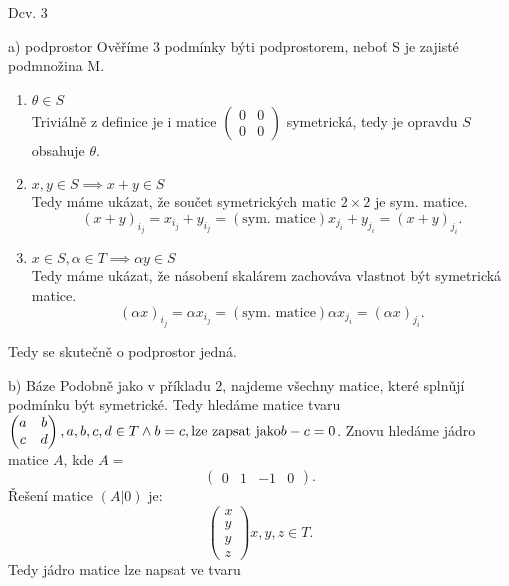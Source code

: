 \documentclass[a4paper]{article}
\begin{document}
\begin{section}{Dcv. 3}
\begin{subsection}{a) podprostor}
    Ověříme 3 podmínky býti podprostorem, neboť S je zajisté podmnožina M.
    \begin{enumerate}
        \item $\theta \in S$\\
            Triviálně z definice je i matice $\begin{pmatrix} 0 & 0 \\ 0 & 0 \end{pmatrix}$ symetrická,
            tedy je opravdu $S$ obsahuje $\theta$.
        \item $x,y \in S \implies x+y \in S$\\
            Tedy máme ukázat, že součet symetrických matic $2\times2$ je sym. matice.\\
            \[
                (x+y)_i_j = x_i_j+y_i_j =(\text{sym. matice}) x_j_i + y_j_i = (x + y)_j_i
            .\] 
        \item $x \in S, \alpha \in T \implies \alpha y \in S$\\
            Tedy máme ukázat, že násobení skalárem zachováva vlastnot být symetrická matice.\\
            \[
                (\alpha x)_i_j = \alpha x_i_j =(\text{sym. matice}) \alpha x_j_i = (\alpha x)_j_i
            .\] 
    \end{enumerate}
    Tedy se skutečně o podprostor jedná.
\end{subsection}
\begin{subsection}{b) Báze}
    Podobně jako v příkladu 2, najdeme všechny matice, které splnǔjí podmínku být symetrické.
    Tedy hledáme matice tvaru $\begin{pmatrix} a & b \\ c & d \end{pmatrix}, a,b,c,d \in T \wedge b =c, \text{lze zapsat jako}\\ b-c = 0$.
    Znovu hledáme jádro matice $A$, kde $A =$
    \[
        \begin{pmatrix} 0 & 1 & -1 & 0 \end{pmatrix}
    .\] 
    Řešení matice $(A|0)$ je:
    \[
        \begin{pmatrix} x \\ y \\ y \\ z  \end{pmatrix} x,y,z \in T
    .\] 
    Tedy jádro matice lze napsat ve tvaru \[
\]
\end{subsection}
\end{section}
\end{document}
